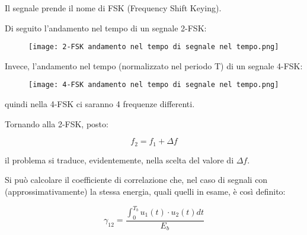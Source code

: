 Il segnale prende il nome di FSK (Frequency Shift Keying). \newline 

\newpage 

Di seguito l'andamento nel tempo di un segnale 2-FSK: 

\begin{figure}[h]
    \centering
    \texttt{[image: 2-FSK andamento nel tempo di segnale nel tempo.png]}
\end{figure}

Invece, l'andamento nel tempo (normalizzato nel periodo T) di un segnale 4-FSK: 

\begin{figure}[h]
    \centering
    \texttt{[image: 4-FSK andamento nel tempo di segnale nel tempo.png]}
\end{figure}

quindi nella 4-FSK ci saranno 4 frequenze differenti. \newline 

Tornando alla 2-FSK, posto: 

{
    \Large 
    \begin{equation}
        f_2 = f_1 + \Delta f
    \end{equation}
}

il problema si traduce, evidentemente, nella scelta del valore di $\Delta f$. \newline 

\newpage 

Si può calcolare il coefficiente di correlazione che, 
nel caso di segnali con (approssimativamente) la stessa energia, quali quelli in esame, è così definito: 

{
    \Large 
    \begin{equation}
        \gamma_{12}
        =
        \frac
        {
        \int_{0}^{T_b}
        u_1 (t) \cdot u_2 (t) dt 
        }{E_b}
    \end{equation}
}

